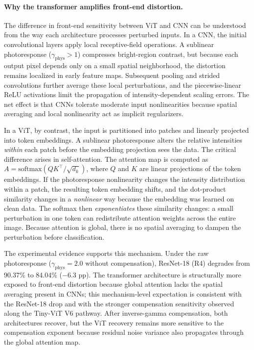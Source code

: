 \paragraph{Why the transformer amplifies front-end distortion.}
The difference in front-end sensitivity between ViT and CNN can be understood from the way each architecture processes perturbed inputs. In a CNN, the initial convolutional layers apply local receptive-field operations. A sublinear photoresponse ($\gamma_{\text{phys}} > 1$) compresses bright-region contrast, but because each output pixel depends only on a small spatial neighborhood, the distortion remains localized in early feature maps. Subsequent pooling and strided convolutions further average these local perturbations, and the piecewise-linear ReLU activations limit the propagation of intensity-dependent scaling errors. The net effect is that CNNs tolerate moderate input nonlinearities because spatial averaging and local nonlinearity act as implicit regularizers.

In a ViT, by contrast, the input is partitioned into patches and linearly projected into token embeddings. A sublinear photoresponse alters the relative intensities \emph{within} each patch before the embedding projection sees the data. The critical difference arises in self-attention. The attention map is computed as $A = \text{softmax}(QK^{\top}/\sqrt{d_k})$, where $Q$ and $K$ are linear projections of the token embeddings. If the photoresponse nonlinearity changes the intensity distribution within a patch, the resulting token embedding shifts, and the dot-product similarity changes in a \emph{nonlinear} way because the embedding was learned on clean data. The softmax then \emph{exponentiates} these similarity changes: a small perturbation in one token can redistribute attention weights across the entire image. Because attention is global, there is no spatial averaging to dampen the perturbation before classification.

The experimental evidence supports this mechanism. Under the raw photoresponse ($\gamma_{\text{phys}}=2.0$ without compensation), ResNet-18 (R4) degrades from 90.37\% to 84.04\% ($-$6.3 pp). The transformer architecture is structurally more exposed to front-end distortion because global attention lacks the spatial averaging present in CNNs; this mechanism-level expectation is consistent with the ResNet-18 drop and with the stronger compensation sensitivity observed along the Tiny-ViT V6 pathway. After inverse-gamma compensation, both architectures recover, but the ViT recovery remains more sensitive to the compensation exponent because residual noise variance also propagates through the global attention map.

